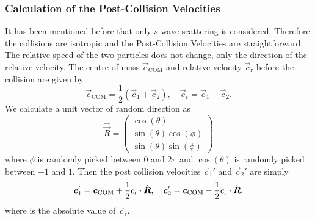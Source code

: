 \subsubsection*{Calculation of the Post-Collision Velocities}
It has been mentioned before that only $s$-wave scattering is considered. Therefore the collisions are isotropic and the Post-Collision Velocities are straightforward. The relative speed of the two particles does not change, only the direction of the relative velocity.
The centre-of-mass $\vec{c}_\text{COM}$ and relative velocity $\vec{c}_\text{r}$ before the collision are given by
\begin{equation*}
    \vec{c}_\text{COM} = \frac{1}{2}(\vec{c}_1 + \vec{c}_2), \quad \vec{c}_\text{r} = \vec{c}_1 - \vec{c}_2.
\end{equation*}
We calculate a unit vector of random direction as
\begin{equation*}
    \hat{\vec{R}} = \begin{pmatrix}
        \cos(\theta) \\ \sin(\theta) \cos(\phi) \\ \sin(\theta) \sin(\phi)
    \end{pmatrix}
\end{equation*}
where $\phi$ is randomly picked between $0$ and $2\pi$ and $\cos(\theta)$ is randomly picked between $-1$ and $1$.
Then the post collision velocities $\vec{c}_1'$ and $\vec{c}_2'$ are simply
\begin{equation*}
    \boldsymbol{c}_1' = \boldsymbol{c}_\text{COM} + \frac{1}{2} c_\text{r} \cdot \hat{\boldsymbol{R}}, \quad \boldsymbol{c}_2' = \boldsymbol{c}_\text{COM} - \frac{1}{2} c_\text{r} \cdot \hat{\boldsymbol{R}}.
\end{equation*}
where \crel is the absolute value of $\vec{c}_\text{r}$.


